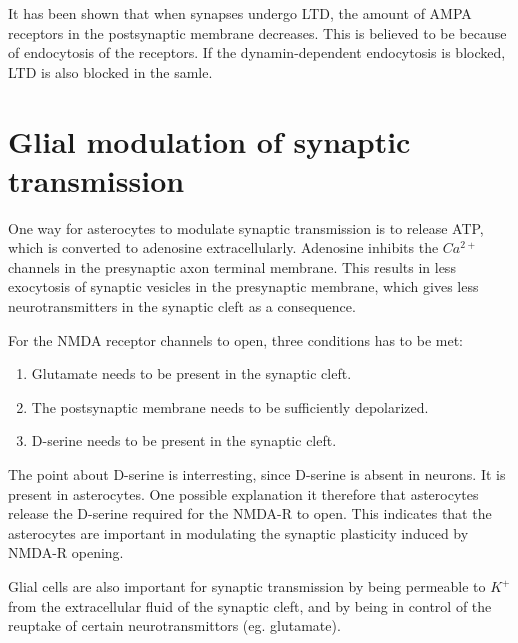 It has been shown that when synapses undergo LTD, the amount of AMPA receptors in the postsynaptic membrane decreases\cite{AMPARtrafficingArtikkel}. 
This is believed to be because of endocytosis of the receptors. If the dynamin-dependent endocytosis is blocked, LTD is also blocked in the samle\cite{AMPARtrafficingArtikkel}.

\section{Glial modulation of synaptic transmission}
One way for asterocytes to modulate synaptic transmission is to release ATP, which is converted to adenosine extracellularly. 
Adenosine inhibits the $Ca^{2+}$ channels in the presynaptic axon terminal membrane\cite{signallingBetweenGlialAndNeuronsInSynPlast}. 
This results in less exocytosis of synaptic vesicles in the presynaptic membrane, which gives less neurotransmitters in the synaptic cleft as a consequence\cite{signallingBetweenGlialAndNeuronsInSynPlast}.

For the NMDA receptor channels to open, three conditions has to be met:
\begin{enumerate}
	\item Glutamate needs to be present in the synaptic cleft.
	\item The postsynaptic membrane needs to be sufficiently depolarized.
	\item D-serine needs to be present in the synaptic cleft\cite{signallingBetweenGlialAndNeuronsInSynPlast}.
\end{enumerate}
The point about D-serine is interresting, since D-serine is absent in neurons. It is present in asterocytes.
One possible explanation it therefore that asterocytes release the D-serine required for the NMDA-R to open\cite{signallingBetweenGlialAndNeuronsInSynPlast}.  %
This indicates that the asterocytes are important in modulating the synaptic plasticity induced by NMDA-R opening.

Glial cells are also important for synaptic transmission by being permeable to $K^+$ from the extracellular fluid of the synaptic cleft\cite{PrinciplesOfNeuralScience4edKAP07}, 
and by being in control of the reuptake of certain neurotransmittors (eg. glutamate)\cite{PrinciplesOfNeuralScience4edKAP15}. %



